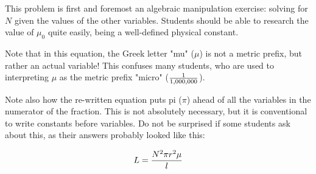 
This problem is first and foremost an algebraic manipulation exercise: solving for $N$ given the values of the other variables.  Students should be able to research the value of $\mu_0$ quite easily, being a well-defined physical constant.

Note that in this equation, the Greek letter "mu" ($\mu$) is not a metric prefix, but rather an actual variable!  This confuses many students, who are used to interpreting $\mu$ as the metric prefix "micro" (${1 \over 1,000,000}$).

Note also how the re-written equation puts pi ($\pi$) ahead of all the variables in the numerator of the fraction.  This is not absolutely necessary, but it is conventional to write constants before variables.  Do not be surprised if some students ask about this, as their answers probably looked like this:

$$L = {{N^2 \pi r^2 \mu} \over l}$$




